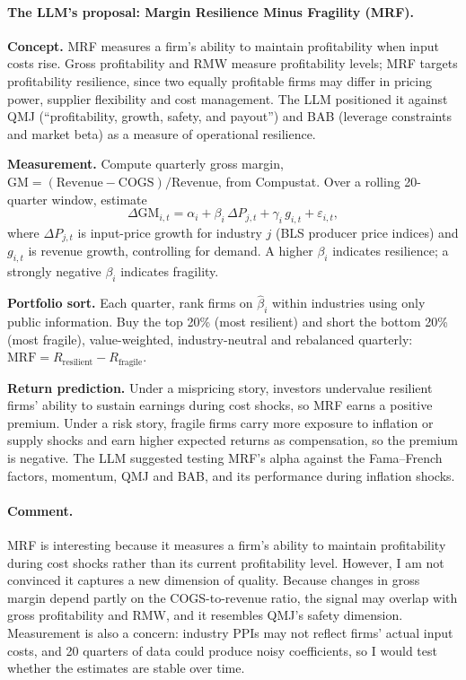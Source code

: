 \paragraph{The LLM's proposal: Margin Resilience Minus Fragility (MRF).}
\begin{tight}
  \item \textbf{Concept.} MRF measures a firm's ability to maintain profitability when input costs rise. Gross profitability and RMW measure profitability levels; MRF targets profitability resilience, since two equally profitable firms may differ in pricing power, supplier flexibility and cost management. The LLM positioned it against QMJ (``profitability, growth, safety, and payout'') and BAB (leverage constraints and market beta) as a measure of operational resilience.
  \item \textbf{Measurement.} Compute quarterly gross margin, $\mathrm{GM}=(\mathrm{Revenue}-\mathrm{COGS})/\mathrm{Revenue}$, from Compustat. Over a rolling 20-quarter window, estimate
  \[
  \Delta\mathrm{GM}_{i,t} = \alpha_i + \beta_i\,\Delta P_{j,t} + \gamma_i\, g_{i,t} + \varepsilon_{i,t},
  \]
  where $\Delta P_{j,t}$ is input-price growth for industry $j$ (BLS producer price indices) and $g_{i,t}$ is revenue growth, controlling for demand. A higher $\beta_i$ indicates resilience; a strongly negative $\beta_i$ indicates fragility.
  \item \textbf{Portfolio sort.} Each quarter, rank firms on $\hat\beta_i$ within industries using only public information. Buy the top 20\% (most resilient) and short the bottom 20\% (most fragile), value-weighted, industry-neutral and rebalanced quarterly: $\text{MRF}=R_{\text{resilient}}-R_{\text{fragile}}$.
  \item \textbf{Return prediction.} Under a mispricing story, investors undervalue resilient firms' ability to sustain earnings during cost shocks, so MRF earns a positive premium. Under a risk story, fragile firms carry more exposure to inflation or supply shocks and earn higher expected returns as compensation, so the premium is negative. The LLM suggested testing MRF's alpha against the Fama--French factors, momentum, QMJ and BAB, and its performance during inflation shocks.
\end{tight}

\paragraph{Comment.}
MRF is interesting because it measures a firm's ability to maintain profitability during cost shocks rather than its current profitability level. However, I am not convinced it captures a new dimension of quality. Because changes in gross margin depend partly on the COGS-to-revenue ratio, the signal may overlap with gross profitability and RMW, and it resembles QMJ's safety dimension. Measurement is also a concern: industry PPIs may not reflect firms' actual input costs, and 20 quarters of data could produce noisy coefficients, so I would test whether the estimates are stable over time.

